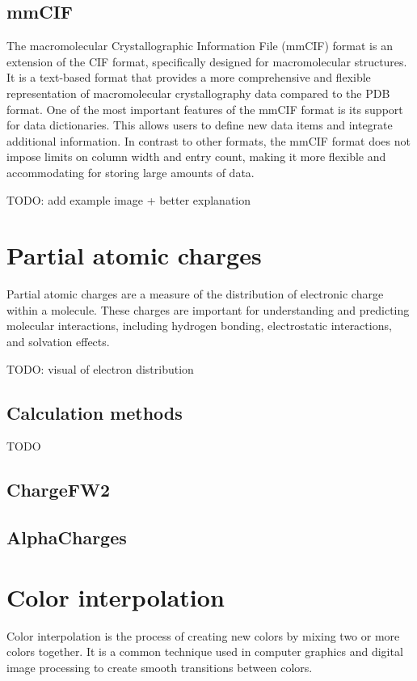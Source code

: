 \documentclass[
  digital,     %
  oneside,     %
  nosansbold,  %
  nocolorbold, %
  lof,         %
  lot,         %
]{fithesis4}
\begin{document}
\subsection{mmCIF}
The macromolecular Crystallographic Information File (mmCIF) format is an extension of the CIF format, specifically designed for macromolecular structures.
It is a text-based format that provides a more comprehensive and flexible representation of macromolecular crystallography data compared to the PDB format.
One of the most important features of the mmCIF format is its support for data dictionaries.
This allows users to define new data items and integrate additional information.
In contrast to other formats, the mmCIF format does not impose limits on column width and entry count, making it more flexible and accommodating for storing large amounts of data.

TODO: add example image + better explanation

\section{Partial atomic charges}
Partial atomic charges are a measure of the distribution of electronic charge within a molecule. These charges are important for understanding and predicting molecular interactions, including hydrogen bonding, electrostatic interactions, and solvation effects.

TODO: visual of electron distribution

\subsection{Calculation methods}
TODO

\subsection{ChargeFW2}
\subsection{AlphaCharges}

\section{Color interpolation}
Color interpolation is the process of creating new colors by mixing two or more colors together. It is a common technique used in computer graphics and digital image processing to create smooth transitions between colors.
\end{document}
